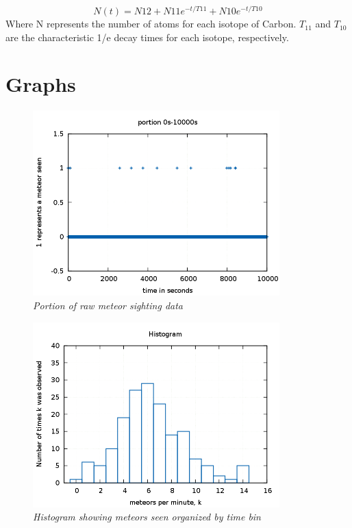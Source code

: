 \documentclass[11pt]{article}
\begin{document}
\begin{equation}
\label{decay}
N(t) = N{12} + N{11}e^{-t/T{11}} + N{10}e^{-t/T{10}}
\end{equation}
Where N represents the number of atoms for each isotope of Carbon.  $T_{11}$ and $T_{10}$ are the characteristic 1/e decay 
times for each isotope, respectively.

\section{Graphs}

\begin{figure}[H]
  \begin{center}
\centerline{\includegraphics[width=3.75in]{portion0_10000.png}}
\caption{\it \small{Portion of raw meteor sighting data \label{fig1}}}
  \end{center}
\end{figure}

\begin{figure}[H]
  \begin{center}
\centerline{\includegraphics[width=3.75in]{meteorhistogram.png}}
\caption{\it \small{Histogram showing meteors seen organized by time bin \label{fig2}}}
  \end{center}
\end{figure}
\end{document}
